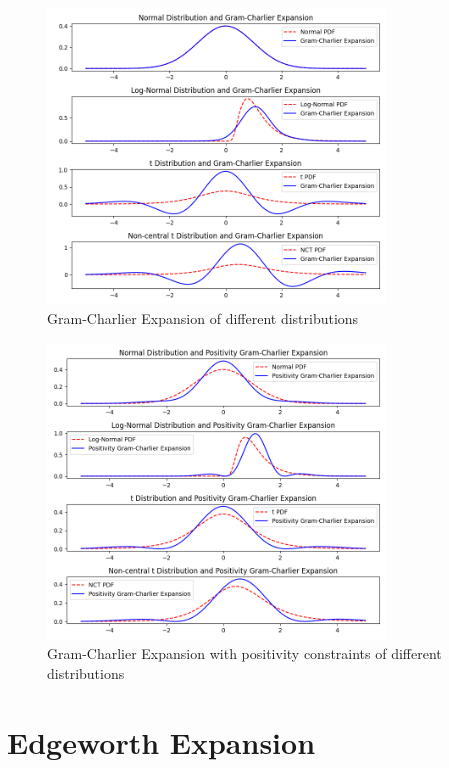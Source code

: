 \begin{figure}[h]
    \centering
    \includegraphics[width=0.8\textwidth]{img/gc_expansion.png}
    \caption{Gram-Charlier Expansion of different distributions}
    \label{fig:gc_expansion}
\end{figure}

\begin{figure}[h]
    \centering
    \includegraphics[width=0.8\textwidth]{img/gc_positivity_expansion.png}
    \caption{Gram-Charlier Expansion with positivity constraints of different distributions}
    \label{fig:gc_positivity_expansion}
\end{figure}

\section{Edgeworth Expansion}

